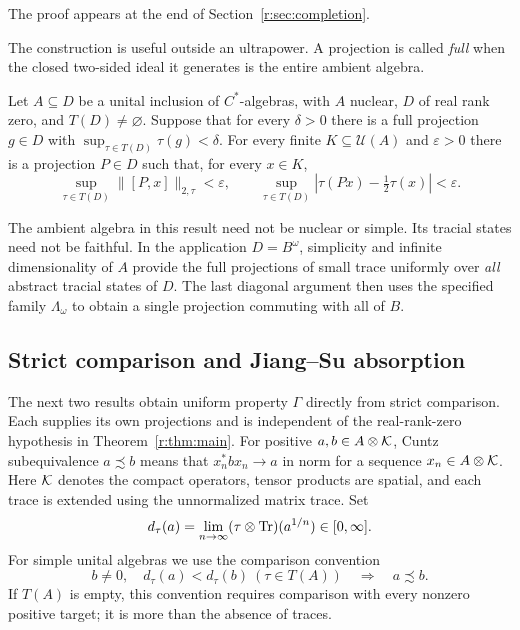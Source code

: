 The proof appears at the end of Section~\ref{r:sec:completion}.

The construction is useful outside an ultrapower. A projection is called
\emph{full} when the closed two-sided ideal it generates is the entire
ambient algebra.

\begin{theorem}\label{r:thm:finite}
Let $A\subseteq D$ be a unital inclusion of $C^*$-algebras, with $A$ nuclear,
$D$ of real rank zero, and $T(D)\ne\varnothing$. Suppose that for every
$\delta>0$ there is a full projection $g\in D$ with
$\sup_{\tau\in T(D)}\tau(g)<\delta$.
For every finite $K\subseteq\mathcal U(A)$ and $\varepsilon>0$ there is a
projection $P\in D$ such that, for every $x\in K$,
\[
 \sup_{\tau\in T(D)}\|[P,x]\|_{2,\tau}<\varepsilon,
 \qquad
 \sup_{\tau\in T(D)}|\tau(Px)-\tfrac12\tau(x)|<\varepsilon.
\]
\end{theorem}

The ambient algebra in this result need not be nuclear or simple. Its
tracial states need not be faithful. In the application $D=B^\omega$,
simplicity and infinite dimensionality of $A$ provide the full projections
of small trace uniformly over \emph{all} abstract tracial states of $D$.
The last diagonal argument then uses the specified family
$\Lambda_\omega$ to obtain a single projection commuting with all of $B$.

\subsection{Strict comparison and Jiang--Su absorption}

The next two results obtain uniform property $\Gamma$ directly from
strict comparison. Each supplies its own projections and is independent
of the real-rank-zero hypothesis in Theorem~\ref{r:thm:main}.
For positive $a,b\in A\otimes\mathcal K$, Cuntz subequivalence $a\precsim b$ means
that $x_n^*bx_n\to a$ in norm for a sequence $x_n\in A\otimes\mathcal K$.
Here $\mathcal K$ denotes the compact operators, tensor products are spatial,
and each trace is extended using the unnormalized matrix trace. Set
\[
 d_\tau(a)=\lim_{n\to\infty}(\tau\otimes\operatorname{Tr})(a^{1/n})\in[0,\infty].
\]
For simple unital algebras we use the comparison convention
\[
 b\ne0,\quad d_\tau(a)<d_\tau(b)\ (\tau\in T(A))
 \quad\Longrightarrow\quad a\precsim b.
\]
If $T(A)$ is empty, this convention requires comparison with every nonzero
positive target; it is more than the absence of traces.

